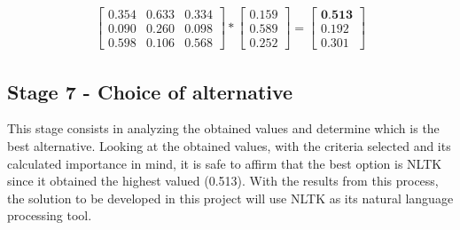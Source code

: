\begin{gather}
    \begin{bmatrix}
        0.354 & 0.633 & 0.334 \\
        0.090 & 0.260 & 0.098 \\
        0.598 & 0.106 & 0.568
    \end{bmatrix}
    *
    \begin{bmatrix}
      0.159 \\
      0.589 \\
      0.252
    \end{bmatrix}
      =
    \begin{bmatrix}
      \textbf{0.513} \\
      0.192 \\
      0.301
    \end{bmatrix}
\end{gather}

\subsection{Stage 7 - Choice of alternative}

This stage consists in analyzing the obtained values and determine which is the best alternative.
Looking at the obtained values, with the criteria selected and its calculated importance in mind, it is safe to affirm that the best option is NLTK since it obtained the highest valued (0.513).
With the results from this process, the solution to be developed in this project will use NLTK as its natural language processing tool.
